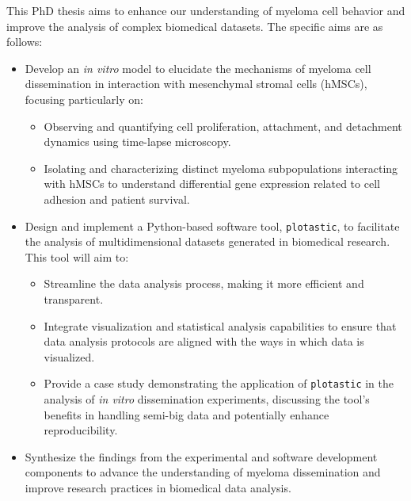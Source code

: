

\label{sec:aims}%
This PhD thesis aims to enhance our understanding of myeloma cell behavior and
improve the analysis of complex biomedical datasets. The specific aims are as
follows:

\begin{itemize}
    \item Develop an \textit{in vitro} model to elucidate the mechanisms of
          myeloma cell dissemination in interaction with mesenchymal stromal cells
          (hMSCs), focusing particularly on:
          \begin{itemize}
              \item Observing and quantifying cell proliferation, attachment, and
                    detachment dynamics using time-lapse microscopy.
              \item Isolating and characterizing distinct myeloma subpopulations
                    interacting with hMSCs to understand differential gene expression
                    related to cell adhesion and patient survival.
          \end{itemize}

    \item Design and implement a Python-based software tool, \texttt{plotastic},
          to facilitate the analysis of multidimensional datasets
          generated in biomedical research. This tool will aim to:
          \begin{itemize}
              \item Streamline the data analysis process, making it more efficient and
                    transparent.
              \item Integrate visualization and statistical analysis capabilities to
                    ensure that data analysis protocols are aligned with the ways in which
                    data is visualized.
              \item Provide a case study demonstrating the application of
                    \texttt{plotastic} in the analysis of \textit{in vitro} dissemination
                    experiments, discussing the tool's benefits in handling semi-big data and
                    potentially enhance reproducibility.
          \end{itemize}

    \item Synthesize the findings from the experimental and software development
          components to advance the understanding of myeloma dissemination and improve
          research practices in biomedical data analysis.
\end{itemize}


